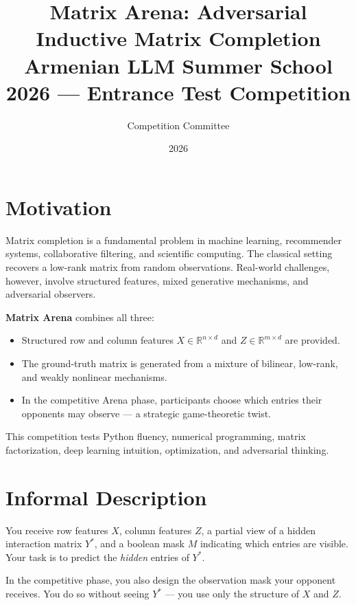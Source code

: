 \documentclass[11pt,a4paper]{article}
\title{\textbf{Matrix Arena: Adversarial Inductive Matrix Completion}\\[0.5em]
\large Armenian LLM Summer School 2026 --- Entrance Test Competition}
\author{Competition Committee}
\date{2026}
\begin{document}
\maketitle
\tableofcontents
\newpage

\section{Motivation}

Matrix completion is a fundamental problem in machine learning, recommender systems,
collaborative filtering, and scientific computing. The classical setting recovers a
low-rank matrix from random observations. Real-world challenges, however, involve
structured features, mixed generative mechanisms, and adversarial observers.

\textbf{Matrix Arena} combines all three:
\begin{itemize}
  \item Structured row and column features $X \in \mathbb{R}^{n \times d}$ and
        $Z \in \mathbb{R}^{m \times d}$ are provided.
  \item The ground-truth matrix is generated from a mixture of bilinear,
        low-rank, and weakly nonlinear mechanisms.
  \item In the competitive Arena phase, participants choose which entries their
        opponents may observe --- a strategic game-theoretic twist.
\end{itemize}

This competition tests Python fluency, numerical programming, matrix factorization,
deep learning intuition, optimization, and adversarial thinking.

\section{Informal Description}

You receive row features $X$, column features $Z$, a partial view of a hidden
interaction matrix $Y^*$, and a boolean mask $M$ indicating which entries are visible.
Your task is to predict the \emph{hidden} entries of $Y^*$.

In the competitive phase, you also design the observation mask your opponent receives.
You do so without seeing $Y^*$ --- you use only the structure of $X$ and $Z$.
\end{document}

